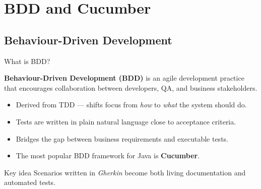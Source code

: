 \documentclass[11pt, xcolor=svgnames]{beamer}
\providecommand{\alert}[1]{\textbf{#1}}
\begin{document}

\section{BDD and Cucumber}


\subsection{Behaviour-Driven Development}


\begin{frame}{What is BDD?}

\alert{Behaviour-Driven Development (BDD)} is an agile development practice that encourages collaboration between developers, QA, and business stakeholders.

\begin{itemize}
  \item Derived from TDD --- shifts focus from \emph{how} to \emph{what} the system should do.
  \item Tests are written in plain natural language close to acceptance criteria.
  \item Bridges the gap between business requirements and executable tests.
  \item The most popular BDD framework for Java is \alert{Cucumber}.
\end{itemize}

\begin{block}{Key idea}
  Scenarios written in \emph{Gherkin} become both living documentation and automated tests.
\end{block}

\end{frame}

\end{document}
